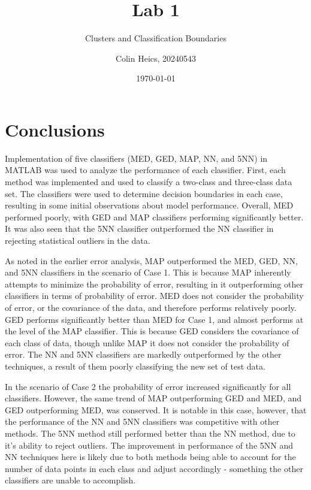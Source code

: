\documentclass[article, 1.5space, letterpaper, 12pt, oneside, header, footer]{SydeClass}
\title{Lab 1}
\subtitle{Clusters and Classification Boundaries}
\author{Colin Heics, 20240543}
\date{\today}
\begin{document}











\section{Conclusions}
Implementation of five classifiers (MED, GED, MAP, NN, and 5NN) in MATLAB was used to analyze the performance of each classifier. First, each method was implemented and used to classify a two-class and three-class data set. The classifiers were used to determine decision boundaries in each case, resulting in some initial observations about model performance. Overall, MED performed poorly, with GED and MAP classifiers performing significantly better. It was also seen that the 5NN classifier outperformed the NN classifier in rejecting statistical outliers in the data.

As noted in the earlier error analysis, MAP outperformed the MED, GED, NN, and 5NN classifiers in the scenario of Case 1. This is because MAP inherently attempts to minimize the probability of error, resulting in it outperforming other classifiers in terms of probability of error. MED does not consider the probability of error, or the covariance of the data, and therefore performs relatively poorly. GED performs significantly better than MED for Case 1, and almost performs at the level of the MAP classifier. This is because GED considers the covariance of each class of data, though unlike MAP it does not consider the probability of error. The NN and 5NN classifiers are markedly outperformed by the other techniques, a result of them poorly classifying the new set of test data.

In the scenario of Case 2 the probability of error increased significantly for all classifiers. However, the same trend of MAP outperforming GED and MED, and GED outperforming MED, was conserved. It is notable in this case, however, that the performance of the NN and 5NN classifiers was competitive with other methods. The 5NN method still performed better than the NN method, due to it's ability to reject outliers. The improvement in performance of the 5NN and NN techniques here is likely due to both methods being able to account for the number of data points in each class and adjust accordingly - something the other classifiers are unable to accomplish.





\end{document}
